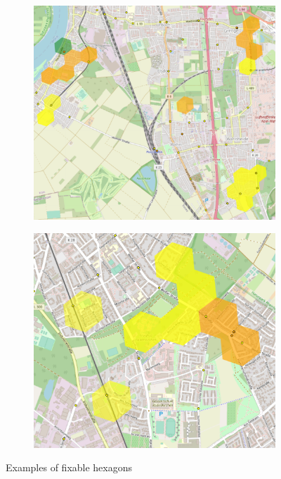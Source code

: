 \begin{figure}
\begin{subfigure}[b]{0.45\textwidth}
         \includegraphics[width=\textwidth]{Figures/results/problematic_hexagons/example_3.png}
     \end{subfigure}
     \hfill
     \begin{subfigure}[b]{0.45\textwidth}
         \centering
         \includegraphics[width=\textwidth]{Figures/results/problematic_hexagons/example_4.png}
     \end{subfigure}
     \caption{Examples of fixable hexagons}
        \label{fig:fixable_hexagons_examples}
\end{figure}

